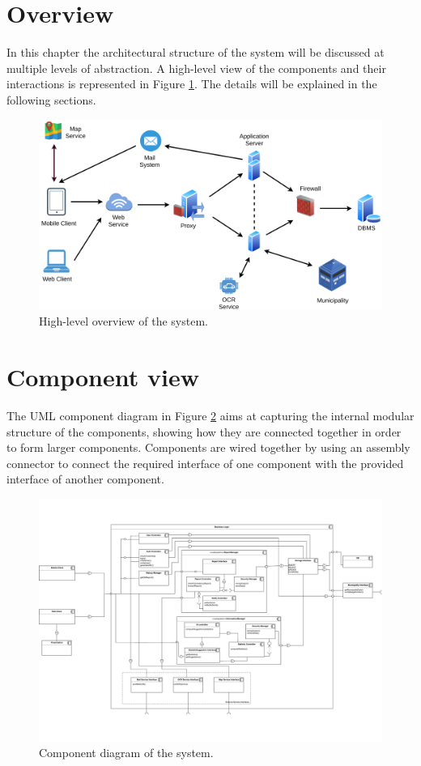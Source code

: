 \documentclass{report}
\begin{document}
\section{Overview}
In this chapter the architectural structure of the system will be discussed at multiple levels of abstraction. A high-level view of the components and their interactions is represented in Figure \ref{fig:overview}. The details will be explained in the following sections.
\begin{figure}[!ht]
	\begin{center}
	\includegraphics[width=\textwidth]{img/HighLevelOverview.png}
    \end{center}
    \label{fig:overview}
	\caption{High-level overview of the system.}
\end{figure}
\newpage
\section{Component view}
The UML component diagram in Figure \ref{fig:componentdiagram} aims at capturing the internal modular structure of the components, showing how they are connected together in order to form larger components. Components are wired together by using an assembly connector to connect the required interface of one component with the provided interface of another component.
\begin{figure}[!ht]
	\begin{center}
	\includegraphics[width=\textwidth]{img/Component2_33.pdf}
    \end{center}
    \label{fig:componentdiagram}
	\caption{Component diagram of the system.}
\end{figure}
\end{document}

